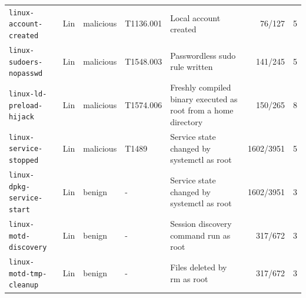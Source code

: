 \begin{table}[t]
\begin{tabular}{@{}lllllrr@{}}
\texttt{linux-account-created} & Lin & malicious & T1136.001 & Local account created & 76/127 & 5\\
\texttt{linux-sudoers-nopasswd} & Lin & malicious & T1548.003 & Passwordless sudo rule written & 141/245 & 5\\
\texttt{linux-ld-preload-hijack} & Lin & malicious & T1574.006 & Freshly compiled binary executed as root from a home directory & 150/265 & 8\\
\texttt{linux-service-stopped} & Lin & malicious & T1489 & Service state changed by systemctl as root & 1602/3951 & 5\\
\texttt{linux-dpkg-service-start} & Lin & benign & - & Service state changed by systemctl as root & 1602/3951 & 3\\
\texttt{linux-motd-discovery} & Lin & benign & - & Session discovery command run as root & 317/672 & 3\\
\texttt{linux-motd-tmp-cleanup} & Lin & benign & - & Files deleted by rm as root & 317/672 & 3\\
\bottomrule\end{tabular}\end{table}
